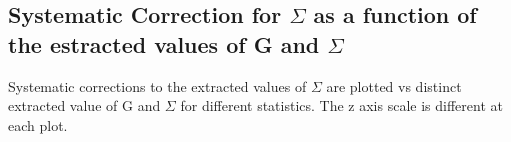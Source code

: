 \subsection{Systematic Correction for \texorpdfstring{$\Sigma$}{Sigma} as a function of the estracted values of G and \texorpdfstring{$\Sigma$}{Sigma}}
\label{app:Sigma_syscorr}
Systematic corrections to the extracted values of $\Sigma$ are plotted vs distinct extracted value of G and $\Sigma$ for different statistics. The z axis scale is different at each plot.
\begin{figure}[htb]
  \begin{center} 
    \\


\end{center}
\end{figure}
